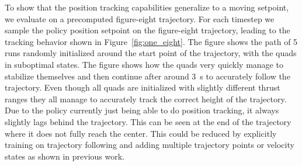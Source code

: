 To show that the position tracking capabilities generalize to a moving setpoint, we evaluate on a precomputed figure-eight trajectory. For each timestep we sample the policy position setpoint on the figure-eight trajectory, leading to the tracking behavior shown in Figure~\ref{fig:one_eight}. The figure shows the path of 5 runs randomly initialized around the start point of the trajectory, with the quads in suboptimal states. The figure shows how the quads very quickly manage to stabilize themselves and then continue after around 3~s to accurately follow the trajectory. Even though all quads are initialized with slightly different thrust ranges they all manage to accurately track the correct height of the trajectory. Due to the policy currently just being able to do position tracking, it always slightly lags behind the trajectory. This can be seen at the end of the trajectory where it does not fully reach the center. This could be reduced by explicitly training on trajectory following and adding multiple trajectory points or velocity states as shown in previous work.

